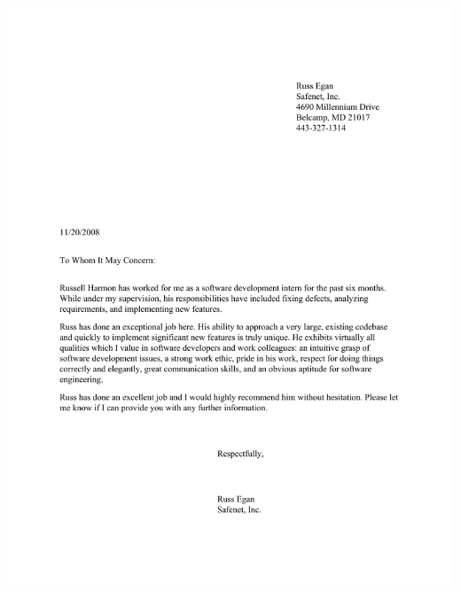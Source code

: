 \documentclass[margins]{res-compat}
\begin{document}
\includegraphics{sfnt-recommendation.pdf}
\end{document}
